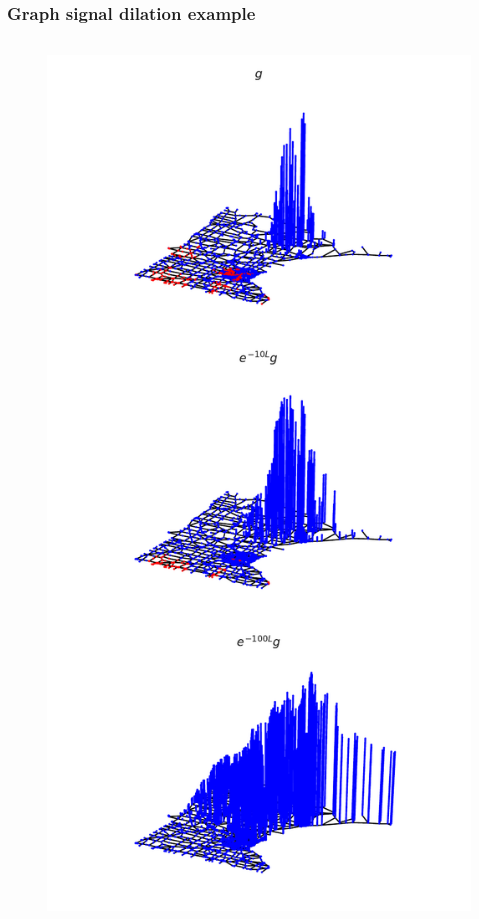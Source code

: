 \documentclass{beamer}
\begin{document}
\begin{frame}
  \frametitle{Graph signal dilation example}
  \begin{columns}
    \begin{column}{0.5\textwidth}
\begin{figure}
\includegraphics[trim={0 10cm 0 0},clip,width=0.9\linewidth]{../img/basic_operations_4.pdf}
\end{figure}
  \end{column}

\end{columns}
\end{frame}
\end{document}
